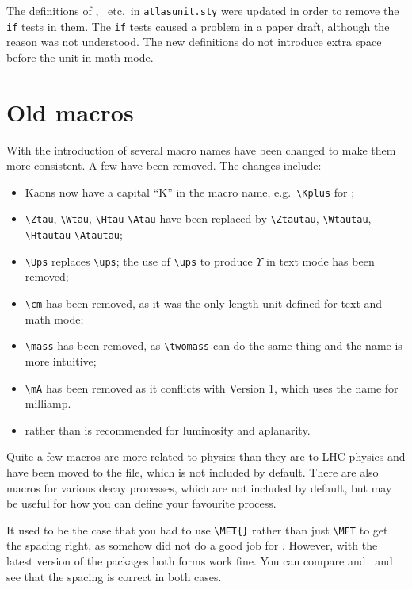 The definitions of \MeV, \GeV\ etc.\ in \texttt{atlasunit.sty} were updated in order to remove the \texttt{if} tests in them.
The \texttt{if} tests caused a problem in a paper draft, although the reason was not understood.
The new definitions do not introduce extra space before the unit in math mode.


\section{Old macros}
\label{sec:old}

With the introduction of  several macro names have been changed to make them more consistent.
A few have been removed. The changes include:
\begin{itemize}
\item Kaons now have a capital \enquote{K} in the macro name, e.g.\ \verb|\Kplus| for \Kplus;
\item \verb|\Ztau|, \verb|\Wtau|, \verb|\Htau| \verb|\Atau| have been replaced by
  \verb|\Ztautau|, \verb|\Wtautau|, \verb|\Htautau| \verb|\Atautau|;
\item \verb|\Ups| replaces \verb|\ups|;
  the use of \verb|\ups| to produce \(\Upsilon\) in text mode has been removed;
\item \verb|\cm| has been removed, as it was the only length unit defined for text and math mode;
\item \verb|\mass| has been removed, as \verb|\twomass| can do the same thing and the name is more intuitive;
\item \verb|\mA| has been removed as it conflicts with  Version 1, which uses the name
  for milliamp.
\item {} rather than  is recommended for luminosity and aplanarity.
\end{itemize}

Quite a few macros are more related to \Zboson physics than they are to LHC physics and have
been moved to the  file, which is not included by default.
There are also macros for various decay processes,  which are not included by default,
but may be useful for how you can define your favourite process.

It used to be the case that you had to use \verb|\MET{}| rather than just \verb|\MET| to get the spacing right,
as somehow  did not do a good job for \met.
However, with the latest version of the packages both forms work fine.
You can compare \MET and \MET\ and see that the spacing is correct in both cases.
